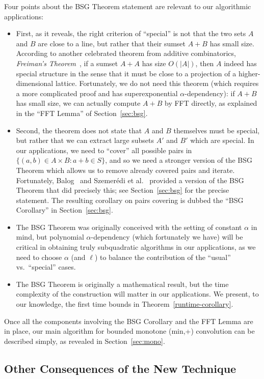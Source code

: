 \documentclass[11pt]{article}
\begin{document}
Four points about the BSG Theorem statement are relevant
to our algorithmic applications:
\begin{itemize}
\item
First, as it reveals, the right criterion of ``special'' is not that
the two sets $A$ and $B$ are close to a line, but rather that
their sumset $A+B$ has small size.
According to another celebrated
theorem from additive combinatorics, {\em Freiman's Theorem}~\cite{Fre,TV06},
if a sumset $A+A$ has size $O(|A|)$, then $A$
indeed has special structure in the sense that it must
be close to a projection of a higher-dimensional
lattice.  Fortunately, we do not need this theorem (which
requires a more complicated proof and has
superexponential $\alpha$-dependency): if $A+B$ has small size,
we can actually compute $A+B$ by FFT directly, as explained in the
``FFT Lemma'' of Section~\ref{sec:bsg}.
\item
Second, the theorem does not state that $A$ and $B$ themselves
must be special,
but rather that we can extract large subsets $A'$ and $B'$ which are special.
In our applications, we need to ``cover'' all possible pairs
in $\{(a,b)\in A\times B:a+b\in S\}$, and so we need a stronger version of the
BSG Theorem which allows us to remove already covered pairs and iterate.  Fortunately,
Balog~\cite{Balog07} and Szemer\'edi et al.~\cite{SSV94} provided
a version of the BSG Theorem that did precisely this;
see Section~\ref{sec:bsg} for the precise statement.
The resulting corollary on pairs covering is dubbed
the ``BSG Corollary'' in Section~\ref{sec:bsg}.
\item
The BSG Theorem was originally conceived with the setting
of constant $\alpha$ in mind, but
polynomial $\alpha$-dependency (which fortunately we have)
will be critical in obtaining truly
subquadratic algorithms in our applications, as we need to
choose $\alpha$ (and $\ell$) to balance the contribution of
the ``usual'' vs.\ ``special'' cases.
\item
The BSG Theorem is originally
a mathematical result, but the time complexity of the
construction will matter in our applications.
We present, to our knowledge, the first time bounds in
Theorem~\ref{runtime-corollary}.
\end{itemize}

Once all the components involving the BSG Corollary and the FFT Lemma
are in place, our main algorithm for bounded monotone (min,+)
convolution can be described simply, as revealed in Section~\ref{sec:mono}.

\subsection{Other Consequences of the New Technique}
\end{document}
